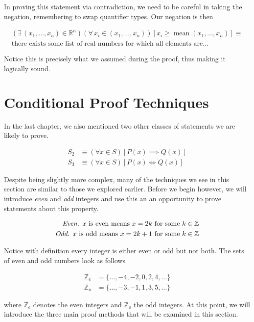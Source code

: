 \documentclass{report}
\DeclareMathOperator{\mean}{mean}
\begin{document}
In proving this statement via contradiction, we need to be careful in taking the negation, remembering to swap quantifier types. Our negation is then

\begin{align*}
	(\exists \, (x_1, \dots, x_n) \in \mathbb{R}^n)(\forall \, x_i \in (x_1, \dots, x_n))[x_i \ge \mean(x_1, \dots, x_n)] \equiv \\
	\text{there exists some list of real numbers for which all elements are...}
\end{align*}

Notice this is precisely what we assumed during the proof, thus making it logically sound. 

\section{Conditional Proof Techniques}

In the last chapter, we also mentioned two other classes of statements we are likely to prove.

\begin{align*}
	S_2 &\equiv (\forall x \in S)[P(x) \implies Q(x)] \\
	S_3 &\equiv (\forall x \in S)[P(x) \iff Q(x)]
\end{align*}

Despite being slightly more complex, many of the techniques we see in this section are similar to those we explored earlier. Before we begin however, we will introduce \emph{even} and \emph{odd} integers  and use this an an opportunity to prove statements about this property.

\begin{align*}
	\emph{Even. } x \text{ is even means } x = 2k \text{ for some } k \in \mathbb{Z} \\
	\emph{Odd. }x \text{ is odd means } x = 2k + 1 \text{ for some } k \in \mathbb{Z}
\end{align*}

Notice with definition every integer is either even or odd but not both. The sets of even and odd numbers look as follows

\begin{align*}
	\mathbb{Z}_e &= \{ \dots, -4, -2, 0, 2, 4, \dots \} \\
	\mathbb{Z}_o &= \{ \dots, -3, -1, 1, 3, 5, \dots \}
\end{align*}

where $\mathbb{Z}_e$ denotes the even integers and $\mathbb{Z}_o$ the odd integers. At this point, we will introduce the three main proof methods that will be examined in this section.
\end{document}
